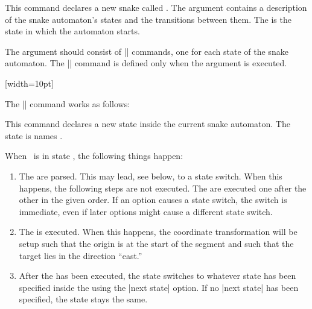 \begin{command}{\pgfdeclaresnake{}}
  This command declares a new snake called . The
   argument contains a description of the snake
  automaton's states and the transitions between them. The
   is the state in which the automaton starts.

  The  argument should consist of |\state| commands, one
  for each state of the snake automaton. The |\state| command is
  defined only when the  argument is executed.

\begin{codeexample}[]
{
  [width=10pt]
  {
    \pgfpathlineto{\pgfpoint{0pt}{5pt}}
    \pgfpathlineto{\pgfpoint{5pt}{5pt}}
    \pgfpathlineto{\pgfpoint{5pt}{-5pt}}
    \pgfpathlineto{\pgfpoint{10pt}{-5pt}}
    \pgfpathlineto{\pgfpoint{10pt}{0pt}}
  }
  {
    \pgfpathlineto{\pgfpoint{\pgfsnakeremainingdistance}{0pt}}
  }
}
\end{codeexample}

  The |\state| command works as follows:
  \begin{command}{\state{}}
    This command declares a new state inside the current snake
    automaton. The state is names .

    When \pgfname\ is in state , the following things
    happen:
    \begin{enumerate}
    \item
      The  are parsed. This may lead, see below, to a 
      state switch. When this happens, the following steps are not
      executed. The  are executed one after the other in
      the given order. If an option causes a state switch, the switch
      is immediate, even if later options might cause a different
      state switch.
    \item
      The  is executed. When this happens, the coordinate
      transformation will be setup such that the origin is at the
      start of the segment and such that the target lies in the
      direction ``east.''
    \item
      After the  has been executed, the state switches to
      whatever state has been specified inside the 
      using the |next state| option. If no |next state| has been
      specified, the state stays the same.
    \end{enumerate}


\end{command}
\end{command}
